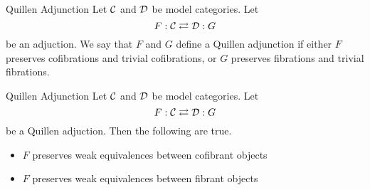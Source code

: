 \documentclass[a4paper]{article}
\begin{document}
\begin{defn}{Quillen Adjunction}{} Let $\mathcal{C}$ and $\mathcal{D}$ be model categories. Let $$F:\mathcal{C}\rightleftarrows\mathcal{D}:G$$ be an adjuction. We say that $F$ and $G$ define a Quillen adjunction if either $F$ preserves cofibrations and trivial cofibrations, or $G$ preserves fibrations and trivial fibrations. 
\end{defn}

\begin{prp}{Quillen Adjunction}{} Let $\mathcal{C}$ and $\mathcal{D}$ be model categories. Let $$F:\mathcal{C}\rightleftarrows\mathcal{D}:G$$ be a Quillen adjuction. Then the following are true. 
\begin{itemize}
\item $F$ preserves weak equivalences between cofibrant objects
\item $F$ preserves weak equivalences between fibrant objects
\end{itemize}
\end{prp}
\end{document}
